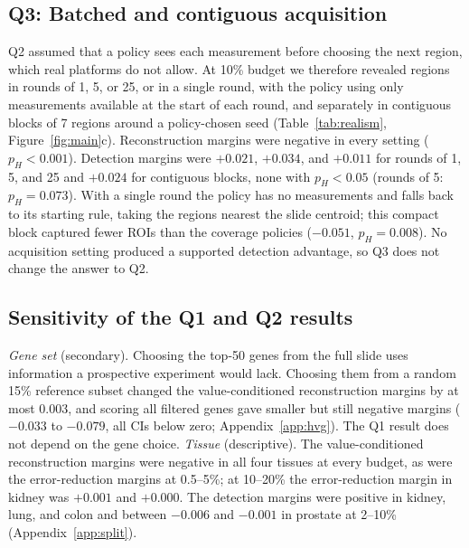 \documentclass{article}
\begin{document}
\begin{table}[t]
\centering
\caption{Absolute ROI-detection recall (fraction of the top-20\% most heterogeneous regions profiled), mean over
22 slides. $^\dagger$Reimplementations of the stated objectives of SCR$^2$-ST (diversity, non-adaptive) and
SOFisher (ROI-seeking, adaptive) in our simulator. $^\ast$Profiles regions in order of true heterogeneity; it
uses ground truth and bounds recall from above.}
\label{tab:detect}
\small

\end{table}

\subsection{Q3: Batched and contiguous acquisition}
Q2 assumed that a policy sees each measurement before choosing the next region, which real platforms do not
allow. At 10\% budget we therefore revealed regions in rounds of 1, 5, or 25, or in a single round, with the
policy using only measurements available at the start of each round, and separately in contiguous blocks of 7
regions around a policy-chosen seed (Table~\ref{tab:realism}, Figure~\ref{fig:main}c). Reconstruction margins
were negative in every setting ($p_H<0.001$). Detection margins were $+0.021$, $+0.034$, and $+0.011$ for rounds
of 1, 5, and 25 and $+0.024$ for contiguous blocks, none with $p_H<0.05$ (rounds of 5: $p_H=0.073$). With a
single round the policy has no measurements and falls back to its starting rule, taking the regions nearest
the slide centroid; this compact block captured fewer ROIs than the coverage policies ($-0.051$, $p_H=0.008$).
No acquisition setting produced a supported detection advantage, so Q3 does not change the answer to Q2.

\begin{table}[t]
\centering
\caption{Value-conditioned policy minus best coverage at 10\% budget under batched and contiguous acquisition
(22 slides; $\Delta$ with 95\% CI resampling studies; $p_H$ Holm-adjusted over the primary family).}
\label{tab:realism}
\resizebox{\textwidth}{!}{}
\end{table}

\subsection{Sensitivity of the Q1 and Q2 results}
\emph{Gene set} (secondary). Choosing the top-50 genes from the full slide uses information a prospective
experiment would lack. Choosing them from a random 15\% reference subset changed the value-conditioned
reconstruction margins by at most 0.003, and scoring all filtered genes gave smaller but still negative margins
($-0.033$ to $-0.079$, all CIs below zero; Appendix~\ref{app:hvg}). The Q1 result does not depend on the gene
choice.
\emph{Tissue} (descriptive). The value-conditioned reconstruction margins were negative in all four tissues at
every budget, as were the error-reduction margins at 0.5--5\%; at 10--20\% the error-reduction margin in kidney
was $+0.001$ and $+0.000$. The detection margins were positive in kidney, lung, and colon and between $-0.006$
and $-0.001$ in prostate at 2--10\% (Appendix~\ref{app:split}).
\end{document}
